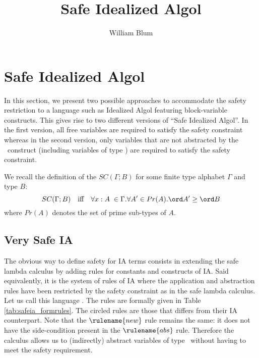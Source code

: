 



\author{William Blum}
\title{Safe Idealized Algol}


\maketitle

\section{Safe Idealized Algol}

In this section, we present two possible approaches to accommodate
the safety restriction to a language such as Idealized Algol
featuring block-variable constructs. This gives rise to two
different versions of ``Safe Idealized Algol''. In the first
version, all free variables are required to satisfy the safety
constraint whereas in the second version, only variables that are
not abstracted by the \ianew\ construct (including variables of type
\iavar) are required to satisfy the safety constraint.

We recall the definition of the  $SC(\Gamma ; B)$
for some finite type alphabet $\Gamma$ and type $B$:
$$SC(\Gamma ; B) \quad \mbox{iff} \quad  \forall x:A\; \in \Gamma . \forall A' \in Pr(A) . \ord A' \geq \ord B$$
where $Pr(A)$ denotes the set of prime sub-types of $A$.



\subsection{Very Safe IA}

 The obvious way to define safety for IA terms consists in extending the safe lambda calculus by adding rules
 for constants and constructs of IA.
Said equivalently, it is the system of rules of IA where the
application and abstraction rules  have been restricted by the
safety constraint as in the safe lambda calculus. Let us call this
language . The rules are formally given in
Table \ref{tab:safeia_formrules}. The circled rules are those that
differs from their IA counterpart. Note that the $\rulename{new}$
rule remains the same: it does not have the side-condition present
in the $\rulename{abs}$ rule. Therefore the calculus allows us to
(indirectly) abstract variables of type \iavar\ without having to
meet the safety requirement.



